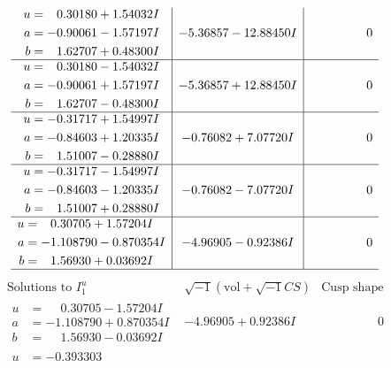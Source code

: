 \documentclass[1p]{elsarticle_modified}
\theoremstyle{definition}
\newcommand{\I}{\sqrt{-1}}
\begin{document}
$$\begin{array}{c|c|c}
\begin{aligned}
u &= \phantom{-}0.30180 + 1.54032 I \\
a &= -0.90061 - 1.57197 I \\
b &= \phantom{-}1.62707 + 0.48300 I\end{aligned}
 & -5.36857 - 12.88450 I & \phantom{-0.000000 } 0 \\ \hline\begin{aligned}
u &= \phantom{-}0.30180 - 1.54032 I \\
a &= -0.90061 + 1.57197 I \\
b &= \phantom{-}1.62707 - 0.48300 I\end{aligned}
 & -5.36857 + 12.88450 I & \phantom{-0.000000 } 0 \\ \hline\begin{aligned}
u &= -0.31717 + 1.54997 I \\
a &= -0.84603 + 1.20335 I \\
b &= \phantom{-}1.51007 - 0.28880 I\end{aligned}
 & -0.76082 + 7.07720 I & \phantom{-0.000000 } 0 \\ \hline\begin{aligned}
u &= -0.31717 - 1.54997 I \\
a &= -0.84603 - 1.20335 I \\
b &= \phantom{-}1.51007 + 0.28880 I\end{aligned}
 & -0.76082 - 7.07720 I & \phantom{-0.000000 } 0 \\ \hline\begin{aligned}
u &= \phantom{-}0.30705 + 1.57204 I \\
a &= -1.108790 - 0.870354 I \\
b &= \phantom{-}1.56930 + 0.03692 I\end{aligned}
 & -4.96905 - 0.92386 I & \phantom{-0.000000 } 0\\
 \hline 
 \end{array}$$\newpage$$\begin{array}{c|c|c}  
\text{Solutions to }I^u_{1}& \I (\text{vol} + \sqrt{-1}CS) & \text{Cusp shape}\\
 \hline 
\begin{aligned}
u &= \phantom{-}0.30705 - 1.57204 I \\
a &= -1.108790 + 0.870354 I \\
b &= \phantom{-}1.56930 - 0.03692 I\end{aligned}
 & -4.96905 + 0.92386 I & \phantom{-0.000000 } 0 \\ \hline\begin{aligned}
u &= -0.393303\phantom{ +0.000000I} \\

\end{aligned}
\end{array}$$
\end{document}

